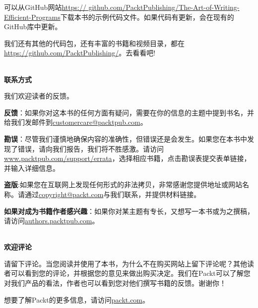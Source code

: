 可以从GitHub网站\url{https://	github.com/PacktPublishing/The-Art-of-Writing-Efficient-Programs}下载本书的示例代码文件。如果代码有更新，会在现有的GitHub库中更新。

我们还有其他的代码包，还有丰富的书籍和视频目录，都在\url{https://github.com/PacktPublishing/}。去看看吧!

\hspace*{\fill} \\ %
\textbf{联系方式}

我们欢迎读者的反馈。

\textbf{反馈}：如果你对这本书的任何方面有疑问，需要在你的信息的主题中提到书名，并给我们发邮件到\url{customercare@packtpub.com}。

\textbf{勘误}：尽管我们谨慎地确保内容的准确性，但错误还是会发生。如果您在本书中发现了错误，请向我们报告，我们将不胜感激。请访问\url{www.packtpub.com/support/errata}，选择相应书籍，点击勘误表提交表单链接，并输入详细信息。

\textbf{盗版}:如果您在互联网上发现任何形式的非法拷贝，非常感谢您提供地址或网站名称。请通过\url{copyright@packt.com}与我们联系，并提供材料链接。

\textbf{如果对成为书籍作者感兴趣}：如果你对某主题有专长，又想写一本书或为之撰稿，请访问\url{authors.packtpub.com}。

\hspace*{\fill} \\ %
\textbf{欢迎评论}

请留下评论。当您阅读并使用了本书，为什么不在购买网站上留下评论呢？其他读者可以看到您的评论，并根据您的意见来做出购买决定。我们在Packt可以了解您对我们产品的看法，作者也可以看到您对他们撰写书籍的反馈。谢谢你！

想要了解Packt的更多信息，请访问\url{packt.com}。











